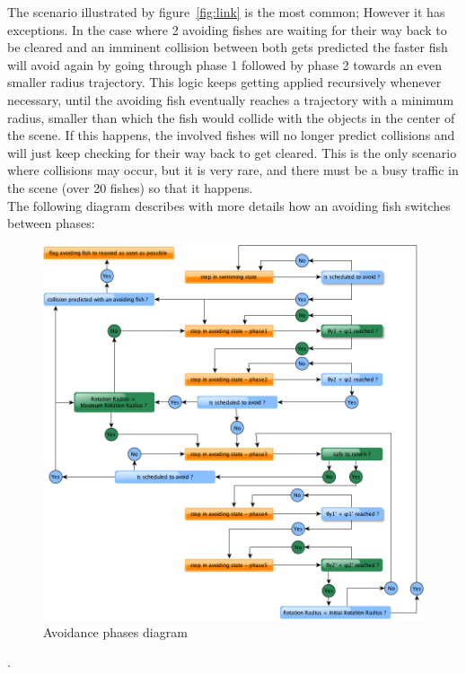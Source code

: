 The scenario illustrated by figure~\ref{fig:link} is the most common; However it has exceptions. In the case where 2 avoiding fishes are waiting for their way back to be cleared and an imminent collision  between both gets predicted the faster fish will avoid again by going through phase 1 followed by phase 2 towards an even smaller radius trajectory. This logic keeps getting applied recursively whenever necessary, until the avoiding fish eventually reaches a trajectory with a minimum radius, smaller than which the fish would collide with the objects in the center of the scene. If this happens, the involved fishes will no longer predict collisions and will just keep checking for their way back to get cleared. This is the only scenario where collisions may occur, but it is very rare, and there must be a busy traffic in the scene (over 20 fishes) so that it happens.\\

The following diagram describes with more details how an avoiding fish switches between phases:\\

\begin{figure}[H]
   \centering
   \includegraphics[scale=0.50]{figures/recursive-avoidance.png}
   \caption{Avoidance phases diagram}
   \label{fig:phases}
\end{figure}.\\

